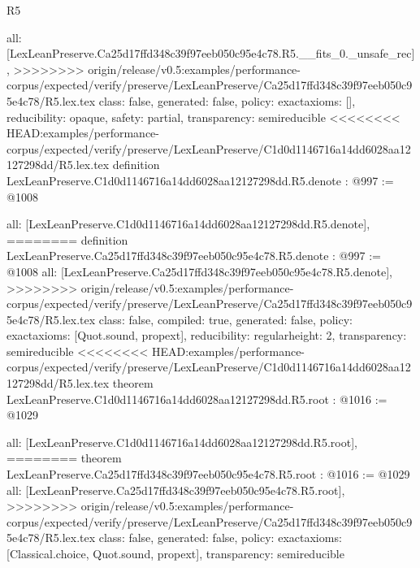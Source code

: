 \begin{lexlean}{R5}
\begin{coremodule}
{{{{{  all: [LexLeanPreserve.Ca25d17ffd348c39f97eeb050c95e4c78.R5.__fits_0._unsafe_rec],
>>>>>>>> origin/release/v0.5:examples/performance-corpus/expected/verify/preserve/LexLeanPreserve/Ca25d17ffd348c39f97eeb050c95e4c78/R5.lex.tex
  class: false,
  generated: false,
  policy: exact{axioms: []},
  reducibility: opaque{},
  safety: partial,
  transparency: semireducible
}
<<<<<<<< HEAD:examples/performance-corpus/expected/verify/preserve/LexLeanPreserve/C1d0d1146716a14dd6028aa12127298dd/R5.lex.tex
definition LexLeanPreserve.C1d0d1146716a14dd6028aa12127298dd.R5.denote : @997 := @1008 {
  all: [LexLeanPreserve.C1d0d1146716a14dd6028aa12127298dd.R5.denote],
========
definition LexLeanPreserve.Ca25d17ffd348c39f97eeb050c95e4c78.R5.denote : @997 := @1008 {
  all: [LexLeanPreserve.Ca25d17ffd348c39f97eeb050c95e4c78.R5.denote],
>>>>>>>> origin/release/v0.5:examples/performance-corpus/expected/verify/preserve/LexLeanPreserve/Ca25d17ffd348c39f97eeb050c95e4c78/R5.lex.tex
  class: false,
  compiled: true,
  generated: false,
  policy: exact{axioms: [Quot.sound, propext]},
  reducibility: regular{height: 2},
  transparency: semireducible
}
<<<<<<<< HEAD:examples/performance-corpus/expected/verify/preserve/LexLeanPreserve/C1d0d1146716a14dd6028aa12127298dd/R5.lex.tex
theorem LexLeanPreserve.C1d0d1146716a14dd6028aa12127298dd.R5.root : @1016 := @1029 {
  all: [LexLeanPreserve.C1d0d1146716a14dd6028aa12127298dd.R5.root],
========
theorem LexLeanPreserve.Ca25d17ffd348c39f97eeb050c95e4c78.R5.root : @1016 := @1029 {
  all: [LexLeanPreserve.Ca25d17ffd348c39f97eeb050c95e4c78.R5.root],
>>>>>>>> origin/release/v0.5:examples/performance-corpus/expected/verify/preserve/LexLeanPreserve/Ca25d17ffd348c39f97eeb050c95e4c78/R5.lex.tex
  class: false,
  generated: false,
  policy: exact{axioms: [Classical.choice, Quot.sound, propext]},
  transparency: semireducible
}

}}}}}}
\end{coremodule}
\end{lexlean}
